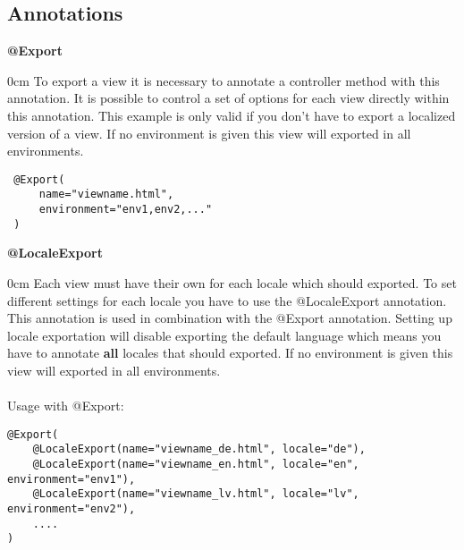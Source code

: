 
\subsection{Annotations}

\noindent
\begin{minipage}{\textwidth}
\textbf{@Export}\\
\vspace{-1em}
\begin{adjustwidth}{\parindent}{0cm}
To export a view it is necessary to annotate a controller method with this annotation. It is possible to control a set of options for each view directly within this annotation. This example is only valid if you don't have to export a localized version of a view. If no environment is given this view will exported in all environments.

\begin{verbatim}
 @Export(
     name="viewname.html",
     environment="env1,env2,..."
 )
\end{verbatim}
\end{adjustwidth}
\vspace{1em}
\end{minipage}

\noindent
\begin{minipage}{\textwidth}
\textbf{@LocaleExport}\\
\vspace{-1em}
\begin{adjustwidth}{\parindent}{0cm}
Each view must have their own for each locale which should exported. To set different settings for each locale you have to use the @LocaleExport annotation. This annotation is used in combination with the @Export annotation. Setting up locale exportation will disable exporting the default language which means you have to annotate \textbf{all} locales that should exported. If no environment is given this view will exported in all environments. \\
\\
Usage with @Export:
\begin{verbatim}
@Export(
    @LocaleExport(name="viewname_de.html", locale="de"),
    @LocaleExport(name="viewname_en.html", locale="en", environment="env1"),
    @LocaleExport(name="viewname_lv.html", locale="lv", environment="env2"),
    ....
)
\end{verbatim}
\end{adjustwidth}
\vspace{1em}
\end{minipage}


